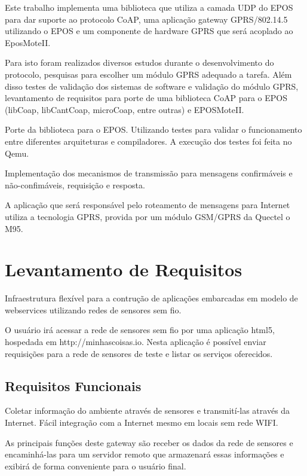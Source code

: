 Este trabalho implementa uma biblioteca que utiliza a camada UDP do EPOS para dar suporte ao protocolo CoAP, uma aplica\c{c}\~ao gateway GPRS/802.14.5 utilizando o EPOS e um componente de hardware GPRS que ser\'a acoplado ao EposMoteII.

Para isto foram realizados diversos estudos durante o desenvolvimento do protocolo, pesquisas para escolher um m\'odulo GPRS adequado a tarefa. Al\'em disso testes de valida\c{c}\~ao dos sistemas de software e valida\c{c}\~ao do m\'odulo GPRS, levantamento de requisitos para porte de uma biblioteca CoAP para o EPOS (libCoap, libCantCoap, microCoap, entre outras) e EPOSMoteII.

Porte da biblioteca para o EPOS. Utilizando testes para validar o funcionamento entre diferentes arquiteturas e compiladores. A execu\c{c}\~ao dos testes foi feita no Qemu.

Implementa\c{c}\~ao dos mecanismos de transmiss\~ao para mensagens confirm\'aveis e n\~ao-confim\'aveis, requisi\c{c}\~ao e resposta.

A aplica\c{c}\~ao que ser\'a respons\'avel pelo roteamento de mensagens para Internet utiliza a tecnologia GPRS, provida por um m\'odulo GSM/GPRS da Quectel o M95.

\section{Levantamento de Requisitos}
Infraestrutura flex\'ivel para a contru\c{c}\~ao de aplica\c{c}\~oes embarcadas em modelo de webservices utilizando redes de sensores sem fio.

O usu\'ario ir\'a acessar a rede de sensores sem fio por uma aplica\c{c}\~ao html5, hospedada em http://minhascoisas.io.
Nesta aplica\c{c}\~ao \'e poss\'ivel enviar requisi\c{c}\~oes para a rede de sensores de teste e listar os servi\c{c}os oferecidos.

\subsection{Requisitos Funcionais}
Coletar informa\c{c}\~ao do ambiente atrav\'es de sensores e transmit\'i-las atrav\'es da Internet. F\'acil integra\c{c}\~ao com a Internet mesmo em locais sem rede WIFI.

As principais fun\c{c}\~oes deste gateway s\~ao receber os dados da rede de sensores e encaminh\'a-las para um servidor remoto que armazenar\'a essas informa\c{c}\~oes e exibir\'a de forma conveniente para o usu\'ario final.


